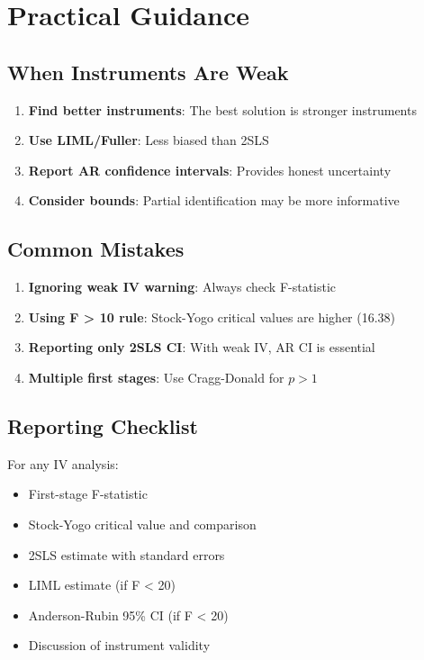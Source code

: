 \section{Practical Guidance}
\label{sec:weak_practical}

\subsection{When Instruments Are Weak}

\begin{enumerate}
    \item \textbf{Find better instruments}: The best solution is stronger instruments
    \item \textbf{Use LIML/Fuller}: Less biased than 2SLS
    \item \textbf{Report AR confidence intervals}: Provides honest uncertainty
    \item \textbf{Consider bounds}: Partial identification may be more informative
\end{enumerate}

\subsection{Common Mistakes}

\begin{enumerate}
    \item \textbf{Ignoring weak IV warning}: Always check F-statistic
    \item \textbf{Using F > 10 rule}: Stock-Yogo critical values are higher (16.38)
    \item \textbf{Reporting only 2SLS CI}: With weak IV, AR CI is essential
    \item \textbf{Multiple first stages}: Use Cragg-Donald for $p > 1$
\end{enumerate}

\subsection{Reporting Checklist}

For any IV analysis:
\begin{itemize}
    \item[$\square$] First-stage F-statistic
    \item[$\square$] Stock-Yogo critical value and comparison
    \item[$\square$] 2SLS estimate with standard errors
    \item[$\square$] LIML estimate (if F < 20)
    \item[$\square$] Anderson-Rubin 95\% CI (if F < 20)
    \item[$\square$] Discussion of instrument validity
\end{itemize}


